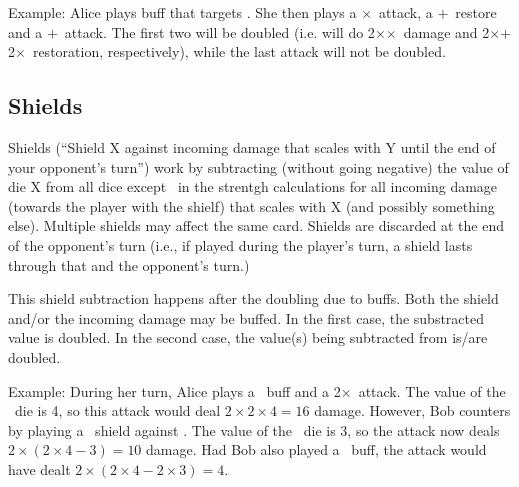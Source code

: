 \documentclass[dvipsnames,parskip,a4paper]{scrartcl}
\newcommand{\iconsize}{3.4mm}
\newcommand{\icondepth}{0.45mm}
\newcommand{\icon}[1]{\raisebox{-\icondepth}{\texttt{[image:  \#1 ]}}}
\newcommand{\fire}{\icon{icons/fire.png}}
\newcommand{\earth}{\icon{icons/earth.png}}
\newcommand{\water}{\icon{icons/water.png}}
\newcommand{\nature}{\icon{icons/nature.png}}
\newcommand{\magic}{\icon{icons/magic.png}}
\begin{document}
\vspace{4pt}

Example: Alice plays buff that targets \fire. She then plays a \fire\hspace{1pt}$\times$\hspace{1pt}\magic \ attack, a \nature\hspace{1pt}$+$\hspace{1pt}\fire \ restore and a \water\hspace{1pt}$+$\hspace{1pt}\earth \ attack. The first two will be doubled (i.e. will do 2\hspace{1pt}$\times$\hspace{1pt}\fire\hspace{1pt}$\times$\hspace{1pt}\magic \ damage and 2\hspace{1pt}$\times$\hspace{1pt}\nature\hspace{1pt}$+$\hspace{1pt}2\hspace{1pt}$\times$\hspace{1pt}\fire \ restoration, respectively), while the last attack will not be doubled.

\subsection*{Shields}

Shields (``Shield X against incoming damage that scales with Y until the end of your opponent's turn'') work by subtracting (without going negative) the value of die X from all dice except \magic \ in the strentgh calculations for all incoming damage (towards the player with the shielf) that scales with X (and possibly something else). Multiple shields may affect the same card. Shields are discarded at the end of the opponent's turn (i.e., if played during the player's turn, a shield lasts through that and the opponent's turn.)

\vspace{4pt}

This shield subtraction happens after the doubling due to buffs. Both the shield and/or the incoming damage may be buffed. In the first case, the substracted value is doubled. In the second case, the value(s) being subtracted from is/are doubled.

\vspace{4pt}

Example: During her turn, Alice plays a \fire \ buff and a 2\hspace{1pt}$\times$\hspace{1pt}\fire \ attack. The value of the \fire \ die is 4, so this attack would deal $2 \times 2 \times 4 = 16$ damage. However, Bob counters by playing a \water \ shield against \fire. The value of the \water \ die is 3, so the attack now deals $2 \times (2 \times 4 - 3) = 10$ damage. Had Bob also played a \water \ buff, the attack would have dealt $2 \times (2 \times 4 - 2 \times 3) = 4$.
\end{document}
